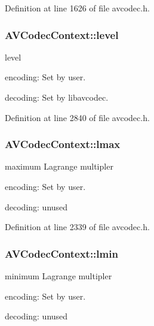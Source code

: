 Definition at line 1626 of file avcodec.\+h.

\subsubsection[{\texorpdfstring{level}{level}}]{ A\+V\+Codec\+Context\+::level}\hypertarget{struct_a_v_codec_context_a6927dc652ae6241f1dfdbad4e12d3a40}{}\label{struct_a_v_codec_context_a6927dc652ae6241f1dfdbad4e12d3a40}
level
\begin{DoxyItemize}
\item encoding\+: Set by user.
\item decoding\+: Set by libavcodec. 
\end{DoxyItemize}

Definition at line 2840 of file avcodec.\+h.

\subsubsection[{\texorpdfstring{lmax}{lmax}}]{ A\+V\+Codec\+Context\+::lmax}\hypertarget{struct_a_v_codec_context_aac412361412d5c8a12203955fbde4433}{}\label{struct_a_v_codec_context_aac412361412d5c8a12203955fbde4433}
maximum Lagrange multipler
\begin{DoxyItemize}
\item encoding\+: Set by user.
\item decoding\+: unused 
\end{DoxyItemize}

Definition at line 2339 of file avcodec.\+h.

\subsubsection[{\texorpdfstring{lmin}{lmin}}]{ A\+V\+Codec\+Context\+::lmin}\hypertarget{struct_a_v_codec_context_ad069371f433207634879772efadea00d}{}\label{struct_a_v_codec_context_ad069371f433207634879772efadea00d}
minimum Lagrange multipler
\begin{DoxyItemize}
\item encoding\+: Set by user.
\item decoding\+: unused 
\end{DoxyItemize}

